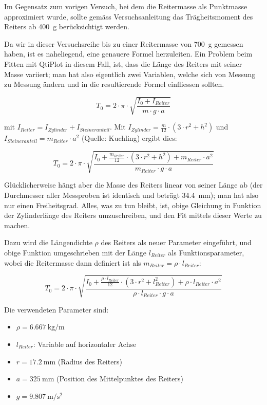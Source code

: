 Im  Gegensatz zum  vorigen Versuch,  bei  dem die  Reitermasse als  Punktmasse
approximiert  wurde, sollte  gem\"ass Versuchsanleitung  das Tr\"agheitsmoment
des Reiters ab \SI{400}{\gram} ber\"ucksichtigt werden.

Da wir  in dieser Versuchsreihe  bis zu einer Reitermasse  von \SI{700}{\gram}
gemessen  haben, ist  es  naheliegend, eine  genauere Formel  herzuleiten. Ein
Problem beim  Fitten mit  QtiPlot in  diesem Fall, ist,  dass die  L\"ange des
Reiters mit  seiner Masse  variiert; man hat  also eigentlich  zwei Variablen,
welche sich  von Messung zu Messung  \"andern und in die  resultierende Formel
einfliessen sollten.

\begin{equation}
    T_0 = 2 \cdot \pi \cdot \sqrt{\frac{I_0 + I_{Reiter}}{m \cdot g \cdot a}}
\end{equation}

mit  $I_{Reiter}  =  I_{Zylinder} +  I_{Steineranteil}$. Mit  $I_{Zylinder}  =
\frac{m}{12} \cdot (  3 \cdot r^2 + h^2)$ und  $I_{Steineranteil} = m_{Reiter}
\cdot a^2$ (Quelle: Kuchling) ergibt dies:

\begin{equation}
    T_0 = 2 \cdot \pi \cdot \sqrt{\frac{I_0 + \frac{m_{Reiter}}{12} \cdot (3\cdot r^2 + h^2) + m_{Reiter} \cdot a^2}{m_{Reiter} \cdot g \cdot a}}
\end{equation}

Gl\"ucklicherweise  h\"angt  aber die  Masse  des  Reiters linear  von  seiner
L\"ange  ab (der  Durchmesser  aller Messproben  ist  identisch und  betr\"agt
\SI{34.4}{\milli\meter}); man hat also  nur einen Freiheitsgrad. Alles, was zu
tun bleibt, ist,  obige Gleichung in Funktion der  Zylinderl\"ange des Reiters
umzuschreiben, und den Fit mittels dieser Werte zu machen.

Dazu  wird  die   L\"angendichte  $\rho$  des  Reiters   als  neuer  Parameter
eingef\"uhrt, und  obige Funktion  umgeschrieben mit der  L\"ange $l_{Reiter}$
als  Funktionsparameter,   wobei  die  Reitermasse  dann   definiert  ist  als
$m_{Reiter} = \rho \cdot l_{Reiter}$:

\begin{equation}
    T_0 = 2 \cdot \pi \cdot \sqrt{\frac{I_0 + \frac{\rho \cdot l_{Reiter}}{12} \cdot (3\cdot r^2 + l_{Reiter}^2) + \rho \cdot l_{Reiter} \cdot a^2}{\rho \cdot l_{Reiter} \cdot g \cdot a}}
\end{equation}

Die verwendeten Parameter sind:
\begin{itemize}
    \item
        $\rho = \SI{6.667}{\kilo\gram\per\meter}$
    \item
        $l_{Reiter}$: Variable auf horizontaler Achse
    \item
        $r = \SI{17.2}{\milli\meter}$ (Radius des Reiters)
    \item
        $a = \SI{325}{\milli\meter}$ (Position des Mittelpunktes des Reiters)
    \item
        $g = \SI{9.807}{\meter\per\second\squared}$
\end{itemize}

